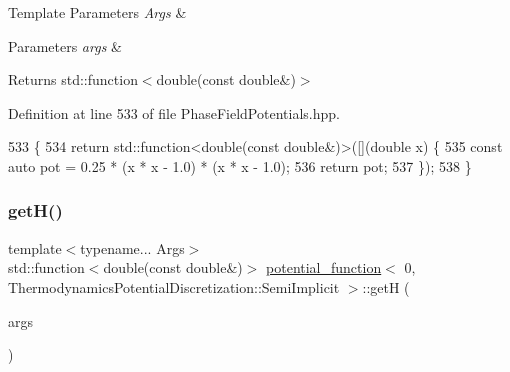 \begin{DoxyTemplParams}{Template Parameters}
{\em Args} & \\
\hline
\end{DoxyTemplParams}

\begin{DoxyParams}{Parameters}
{\em args} & \\
\hline
\end{DoxyParams}
\begin{DoxyReturn}{Returns}
std\+::function$<$double(const double\&)$>$ 
\end{DoxyReturn}


Definition at line 533 of file Phase\+Field\+Potentials.\+hpp.


\begin{DoxyCode}
533                                                         \{
534     \textcolor{keywordflow}{return} std::function<double(const double&)>([](\textcolor{keywordtype}{double} x) \{
535       \textcolor{keyword}{const} \textcolor{keyword}{auto} pot = 0.25 * (x * x - 1.0) * (x * x - 1.0);
536       \textcolor{keywordflow}{return} pot;
537     \});
538   \}
\end{DoxyCode}
\mbox{\label{structpotential__function_3_010_00_01ThermodynamicsPotentialDiscretization_1_1SemiImplicit_01_4_a04b03e529ffbac36d76a9dcd1353c61e}} 
\subsubsection{\texorpdfstring{get\+H()}{getH()}}
{\footnotesize\ttfamily template$<$typename... Args$>$ \\
std\+::function$<$double(const double\&)$>$ \hyperlink{structpotential__function}{potential\+\_\+function}$<$ 0, Thermodynamics\+Potential\+Discretization\+::\+Semi\+Implicit $>$\+::getH (\begin{DoxyParamCaption}\item[{Args...}]{args }\end{DoxyParamCaption})\hspace{0.3cm}{\ttfamily [inline]}}



